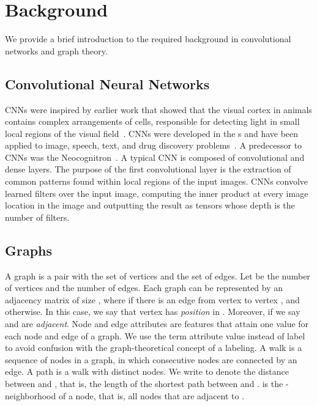 \documentclass{article}
\begin{document}
\section{Background}
We provide a brief introduction to the required background in convolutional networks and graph theory.
\subsection{Convolutional Neural Networks}

CNNs were inspired by earlier work that showed that the visual cortex in animals contains complex arrangements of cells, responsible for detecting light in small local regions of the visual field~\cite{hubel:1968}. CNNs were developed in the s and have been  applied to image, speech, text, and drug discovery problems~\cite{atlas:1987,LeCun:1989,lecun:1998,lecun:2015,WallachDH:2015}. A predecessor to CNNs was the Neocognitron~\cite{Kunihiko:1980}. A typical CNN is composed of convolutional and dense layers. The purpose of the first convolutional layer is the extraction of common patterns found within local regions of the input images. CNNs convolve learned filters over the input image, computing the inner product at every image location
in the image and outputting the result as tensors whose depth is the number of filters.

\subsection{Graphs}

A graph  is a pair  with  the set of vertices and  the set of edges. Let  be the number of vertices and  the number of edges. Each graph can be represented by an adjacency matrix  of size , where  if there is an edge from vertex  to vertex 
, and  otherwise. In this case, we say that vertex  has \emph{position}  in . Moreover, if  we say  and  are \emph{adjacent}. Node and edge attributes are features that attain one value for each node and edge of a graph. We use the term attribute value instead of label to avoid confusion with the graph-theoretical concept of a labeling. 
A walk is a sequence of nodes in a graph, in which consecutive nodes are connected by an edge. A path is a walk with distinct nodes.
We write  to denote the distance between  and , that is, the length of the shortest path between  and .
 is the -neighborhood of a node, that is, all nodes that are adjacent to . 
\end{document}
